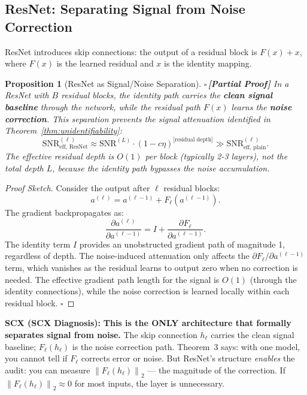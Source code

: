 \documentclass[12pt,a4paper]{article}
\newtheorem{proposition}[theorem]{Proposition}
\theoremstyle{definition}
\newcommand{\rigorPartial}{{\color{rigorcolor}$\square$\,\textbf{[Partial Proof]}}}
\newcommand{\norm}[1]{\left\lVert#1\right\rVert}
\newcommand{\diagnosis}{\noindent\textbf{SCX (SCX Diagnosis):} }
\begin{document}
\subsection*{ResNet: Separating Signal from Noise Correction}

ResNet introduces skip connections: the output of a residual block is $F(x) + x$, where $F(x)$ is the learned residual and $x$ is the identity mapping.

\begin{proposition}[ResNet as Signal/Noise Separation]\label{prop:resnet_separation}
\rigorPartial
In a ResNet with $B$ residual blocks, the identity path carries the \textbf{clean signal baseline} through the network, while the residual path $F(x)$ learns the \textbf{noise correction}. This separation prevents the signal attenuation identified in Theorem~\ref{thm:unidentifiability}:
\begin{equation}\label{eq:resnet_snr}
    \text{SNR}_{\text{eff, ResNet}}^{(\ell)} \approx \text{SNR}^{(L)} \cdot (1 - c\eta)^{\text{[residual depth]}} \gg \text{SNR}_{\text{eff, plain}}^{(\ell)}.
\end{equation}
The effective residual depth is $O(1)$ per block (typically 2-3 layers), not the total depth $L$, because the identity path bypasses the noise accumulation.
\end{proposition}

\begin{proof}[Proof Sketch]
Consider the output after $\ell$ residual blocks:
\begin{equation}
    a^{(\ell)} = a^{(\ell-1)} + F_\ell(a^{(\ell-1)}).
\end{equation}
The gradient backpropagates as:
\begin{equation}
    \frac{\partial a^{(\ell)}}{\partial a^{(\ell-1)}} = I + \frac{\partial F_\ell}{\partial a^{(\ell-1)}}.
\end{equation}
The identity term $I$ provides an unobstructed gradient path of magnitude 1, regardless of depth. The noise-induced attenuation only affects the $\partial F_\ell / \partial a^{(\ell-1)}$ term, which vanishes as the residual learns to output zero when no correction is needed. The effective gradient path length for the signal is $O(1)$ (through the identity connections), while the noise correction is learned locally within each residual block. \hfill $\square$
\end{proof}

\diagnosis{} \textbf{This is the ONLY architecture that formally separates signal from noise.} The skip connection $h_\ell$ carries the clean signal baseline; $F_\ell(h_\ell)$ is the noise correction path. Theorem~3 says: with one model, you cannot tell if $F_\ell$ corrects error or noise. But ResNet's structure \textit{enables} the audit: you can measure $\norm{F_\ell(h_\ell)}_2$ — the magnitude of the correction. If $\norm{F_\ell(h_\ell)}_2 \approx 0$ for most inputs, the layer is unnecessary.
\end{document}
